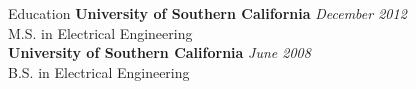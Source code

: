 \documentclass{resume} %
\begin{document}

\begin{rSection}{Education}
{\bf University of Southern California} \hfill {\em December 2012} \\
M.S. in Electrical Engineering \\
{\bf University of Southern California} \hfill {\em June 2008} \\ 
B.S. in Electrical Engineering \\
\end{rSection}




\end{document}
